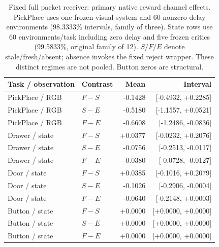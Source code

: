\begin{table}[tb]\centering\small
\caption{Fixed full packet receiver: primary native reward channel effects. PickPlace uses one frozen visual system and 60 nonzero-delay environments (98.3333\% intervals, family of three). State rows use 60 environments/task including zero delay and five frozen critics (99.5833\%, original family of 12). $S/F/E$ denote stale/fresh/absent; absence invokes the fixed reject wrapper. These distinct regimes are not pooled. Button zeros are structural.}\label{tab:channel}
\setlength{\tabcolsep}{4pt}\begin{tabular}{llrr}\toprule Task / observation & Contrast & Mean & Interval\\\midrule
PickPlace / RGB & $F-S$ & -0.1428 & [-0.4932, +0.2285]\\
PickPlace / RGB & $S-E$ & -0.5180 & [-1.1557, +0.0521]\\
PickPlace / RGB & $F-E$ & -0.6608 & [-1.2486, -0.0836]\\
Drawer / state & $F-S$ & +0.0377 & [-0.0232, +0.2076]\\
Drawer / state & $S-E$ & -0.0756 & [-0.2513, -0.0117]\\
Drawer / state & $F-E$ & -0.0380 & [-0.0728, -0.0127]\\
Door / state & $F-S$ & +0.0385 & [-0.1016, +0.2079]\\
Door / state & $S-E$ & -0.1026 & [-0.2906, -0.0004]\\
Door / state & $F-E$ & -0.0640 & [-0.2148, +0.0003]\\
Button / state & $F-S$ & +0.0000 & [+0.0000, +0.0000]\\
Button / state & $S-E$ & +0.0000 & [+0.0000, +0.0000]\\
Button / state & $F-E$ & +0.0000 & [+0.0000, +0.0000]\\
\bottomrule\end{tabular}\end{table}
